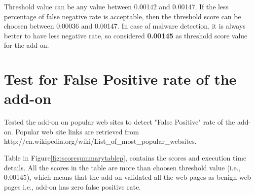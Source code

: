 Threshold value can be any value between 0.00142 and 0.00147. If the less percentage of false negative rate is acceptable, then the threshold score can be choosen between 0.00036 and 0.00147. In case of malware detection, it is always better to have less negative rate, so considered \textbf{0.00145} as threshold score value for the add-on.

\section{Test for False Positive rate of the add-on}

Tested the add-on on popular web sites to detect "False Positive" rate of the add-on. Popular web site links are retrieved from http://en.wikipedia.org/wiki/List\_of\_most\_popular\_websites. 

Table in Figure\ref{fig:scoresummarytablep}, contains the scores and execution time details. All the scores in the table are more than choosen threshold value (i.e., 0.00145), which means that the add-on validated all the web pages as benign web pages i.e., add-on has zero false positive rate.

